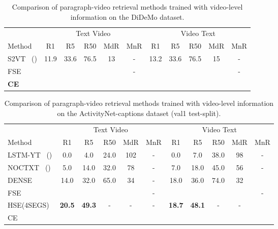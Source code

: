 \documentclass{bmvc2k}
\begin{document}
\begin{table}[h!]
\centering 
\footnotesize 
\setlength{\tabcolsep}{2pt}
\begin{tabular}{l | @{\hskip -0.2cm}c@{\hskip -0.35cm}c@{\hskip -0.35cm}c@{\hskip -0.1cm}c@{\hskip -0.2cm}c |@{\hskip -0.2cm}c@{\hskip -0.35cm}c@{\hskip -0.35cm}c@{\hskip -0.1cm}c@{\hskip -0.2cm}c} 
\hline \hline
\multicolumn{1}{c}{} & 
\multicolumn{5}{c}{Text  Video} & \multicolumn{5}{c}{Video  Text} \\
Method & R1 & R5 & R50 & MdR & MnR & R1 & R5 & R50 & MdR & MnR \\ 
\hline 
S2VT~\cite{venugopalan2014translating} (\cite{zhang2018cross}) & 11.9 & 33.6 & 76.5 & 13 & - & 13.2 & 33.6 & 76.5 & 15 & - \\
FSE~\cite{zhang2018cross} &  &  &  &  & - &  &  &  &  &  - \\
\textbf{CE} & 	& 	& 	&  &  & 	& 	& 	& 	&  \\
\hline \hline
\end{tabular}
\vspace{0.2cm}
\caption{Comparison of paragraph-video retrieval methods trained with video-level information on the DiDeMo dataset.}
\label{table:DiDeMo} 
\end{table} 
\begin{table}[h]
\centering 
\footnotesize 
\setlength{\tabcolsep}{2pt}
\begin{tabular}{l | @{\hskip -0.2cm}c@{\hskip -0.35cm}c@{\hskip -0.35cm}c@{\hskip -0.1cm}c@{\hskip -0.2cm}c |@{\hskip -0.2cm}c@{\hskip -0.35cm}c@{\hskip -0.35cm}c@{\hskip -0.1cm}c@{\hskip -0.2cm}c} 
\hline \hline 
\multicolumn{1}{c}{} & 
\multicolumn{5}{c}{Text  Video} & \multicolumn{5}{c}{Video  Text} \\
Method & R1 & R5 & R50 & MdR & MnR & R1 & R5 & R50 & MdR & MnR \\ 
\hline 
LSTM-YT~\cite{venugopalan2015sequence} (\cite{zhang2018cross}) & 0.0 & 4.0 & 24.0 & 102 & - & 0.0 & 7.0 & 38.0  & 98 & - \\
NOCTXT~\cite{venugopalan2014translating} (\cite{zhang2018cross})& 5.0 & 14.0 & 32.0 & 78 & - & 7.0 & 18.0 & 45.0 & 56 & - \\
DENSE~\cite{krishna2017dense} & 14.0 & 32.0 & 65.0 & 34 & - & 18.0 & 36.0 & 74.0 & 32 \\
FSE~\cite{zhang2018cross} &  &  &  &  & - &  &  &  &  &  - \\
HSE(4SEGS)~\cite{zhang2018cross} & \textbf{20.5} & \textbf{49.3} & - & - & - & \textbf{18.7} & \textbf{48.1} & - & - \\
CE & 	& 	& 	& 	&  & 	& 	& 	& 	&  \\
\hline \hline
\end{tabular}
\vspace{0.3cm}
\caption{Comparison of paragraph-video retrieval methods trained with video-level information on the ActivityNet-captions dataset (val1 test-split).}
\label{table:AN} 
\end{table}
\end{document}
